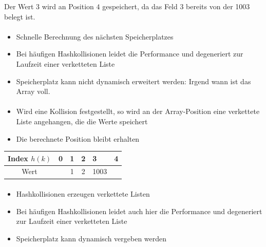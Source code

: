 {\begin{frame}{\insertsection}
\begin{center}
\begin{tabular}{|c|c|c|c|c|c|}
		\end{tabular}
	\end{center}	
	Der Wert $3$ wird an Position $4$ gespeichert, da das Feld $3$ bereits von der 1003 belegt ist. 
\end{frame}
%
\begin{frame}{\insertsection}
	\framesubtitle{\insertsubsection}
	\begin{itemize}
		\item Schnelle Berechnung des nächsten Speicherplatzes 
		\item Bei häufigen Hashkollisionen leidet die Performance und degeneriert zur Laufzeit einer verketteten Liste
		\item Speicherplatz kann nicht dynamisch erweitert werden: Irgend wann ist das Array voll.
	\end{itemize}	
\end{frame}
%
\begin{frame}{\insertsection}
	\framesubtitle{\insertsubsection}
	\begin{itemize}
		\item Wird eine Kollision festgestellt, so wird an der Array-Position eine verkettete Liste angehangen, die die Werte speichert
		\item Die berechnete Position bleibt erhalten
	\end{itemize}
	\vspace{5mm}
	\begin{center}
		\begin{tabular}{|c|c|c|c|p{7mm}|c|}\hline
			Index $h(k)$ & 0 & 1 & 2 & 3 & 4  \\\hline\hline
			Wert & &1&2 & \cellcolor{Yellow}1003\newline 3 & \\\hline
		\end{tabular}
	\end{center}
\end{frame}
%
\begin{frame}{\insertsection}
	\framesubtitle{\insertsubsection}
	\begin{itemize}
		\item Hashkollisionen erzeugen verkettete Listen
		\item Bei häufigen Hashkollisionen leidet auch hier die Performance und degeneriert zur Laufzeit einer verketteten Liste
		\item Speicherplatz kann dynamisch vergeben werden

\end{itemize}
\end{frame}}
